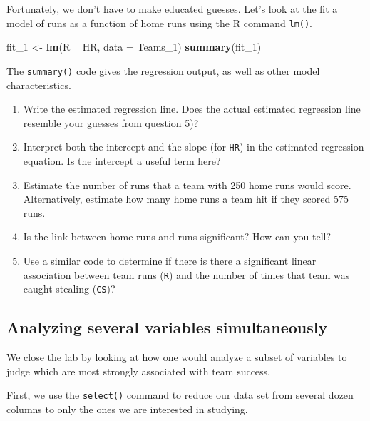 \documentclass[]{article}
\newenvironment{Shaded}{\begin{snugshade}}{\end{snugshade}}
\newcommand{\DataTypeTok}[1]{\textcolor[rgb]{0.13,0.29,0.53}{#1}}
\newcommand{\DecValTok}[1]{\textcolor[rgb]{0.00,0.00,0.81}{#1}}
\newcommand{\KeywordTok}[1]{\textcolor[rgb]{0.13,0.29,0.53}{\textbf{#1}}}
\newcommand{\NormalTok}[1]{#1}
\newcommand{\OperatorTok}[1]{\textcolor[rgb]{0.81,0.36,0.00}{\textbf{#1}}}
\newcommand{\StringTok}[1]{\textcolor[rgb]{0.31,0.60,0.02}{#1}}
\begin{document}
Fortunately, we don't have to make educated guesses. Let's look at the
fit a model of runs as a function of home runs using the R command
\texttt{lm()}.

\begin{Shaded}
\begin{Highlighting}[]
\NormalTok{fit_}\DecValTok{1}\NormalTok{ <-}\StringTok{ }\KeywordTok{lm}\NormalTok{(R }\OperatorTok{~}\StringTok{ }\NormalTok{HR, }\DataTypeTok{data =}\NormalTok{ Teams_}\DecValTok{1}\NormalTok{)}
\KeywordTok{summary}\NormalTok{(fit_}\DecValTok{1}\NormalTok{)}
\end{Highlighting}
\end{Shaded}

The \texttt{summary()} code gives the regression output, as well as
other model characteristics.

\begin{enumerate}
\def\labelenumi{\arabic{enumi}.}
\setcounter{enumi}{5}
\item
  Write the estimated regression line. Does the actual estimated
  regression line resemble your guesses from question 5)?
\item
  Interpret both the intercept and the slope (for \texttt{HR}) in the
  estimated regression equation. Is the intercept a useful term here?
\item
  Estimate the number of runs that a team with 250 home runs would
  score. Alternatively, estimate how many home runs a team hit if they
  scored 575 runs.
\item
  Is the link between home runs and runs significant? How can you tell?
\item
  Use a similar code to determine if there is there a significant linear
  association between team runs (\texttt{R}) and the number of times
  that team was caught stealing (\texttt{CS})?
\end{enumerate}

\hypertarget{analyzing-several-variables-simultaneously}{%
\subsection{Analyzing several variables
simultaneously}\label{analyzing-several-variables-simultaneously}}

We close the lab by looking at how one would analyze a subset of
variables to judge which are most strongly associated with team success.

First, we use the \texttt{select()} command to reduce our data set from
several dozen columns to only the ones we are interested in studying.
\end{document}
